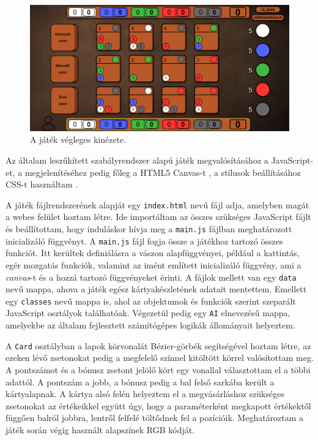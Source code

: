 \begin{figure}[h]
\centering
\includegraphics[width=\textwidth]{images/screen_structure.png}
\caption{A játék végleges kinézete.}
\label{fig:screen_structure}
\end{figure}


Az általam leszűkített szabályrendszer alapú játék megvalósításához a JavaScript-et, a megjelenítéséhez pedig főleg a HTML5 Canvas-t \cite{fulton2013html5}, a stílusok beállításához CSS-t használtam \cite{gasston2011book}.


A játék fájlrendszerének alapját egy \texttt{index.html} nevű fájl adja, amelyben magát a webes felület hoztam létre. Ide importáltam az összes szükséges JavaScript fájlt és beállítottam, hogy induláskor hívja meg a \texttt{main.js} fájlban meghatározott inicializáló függvényt. A \texttt{main.js} fájl fogja össze a játékhoz tartozó összes funkciót. Itt kerültek definiálásra a vászon alapfüggvényei, például a kattintás, egér mozgatás funkciók, valamint az imént említett inicializáló függvény, ami a \textit{canvas}-t és a hozzá tartozó függvényeket érinti. A fájlok mellett van egy \texttt{data} nevű mappa, ahova a játék egész kártyakészletének adatait mentettem. Emellett egy \texttt{classes} nevű mappa is, ahol az objektumok és funkciók szerint szeparált JavaScript osztályok találhatóak. Végezetül pedig egy \texttt{AI} elnevezésű mappa, amelyekbe az általam fejlesztett számítógépes logikák állományait helyeztem.


A \texttt{Card} osztályban a lapok körvonalát Bézier-görbék segítségével hoztam létre, az ezeken lévő zsetonokat pedig a megfelelő színnel kitöltött körrel valósítottam meg. A pontszámot és a bónusz zsetont jelölő kört egy vonallal választottam el a többi adattól. A pontszám a jobb, a bónusz pedig a bal felső sarkába került a kártyalapnak. A kártya alsó felén helyeztem el a megvásárláshoz szükséges zsetonokat az értékeikkel együtt úgy, hogy a paraméterként megkapott értékektől függően balról jobbra, lentről felfelé töltődnek fel a pozícióik. Meghatároztam a játék során végig használt alapszínek RGB kódját.

